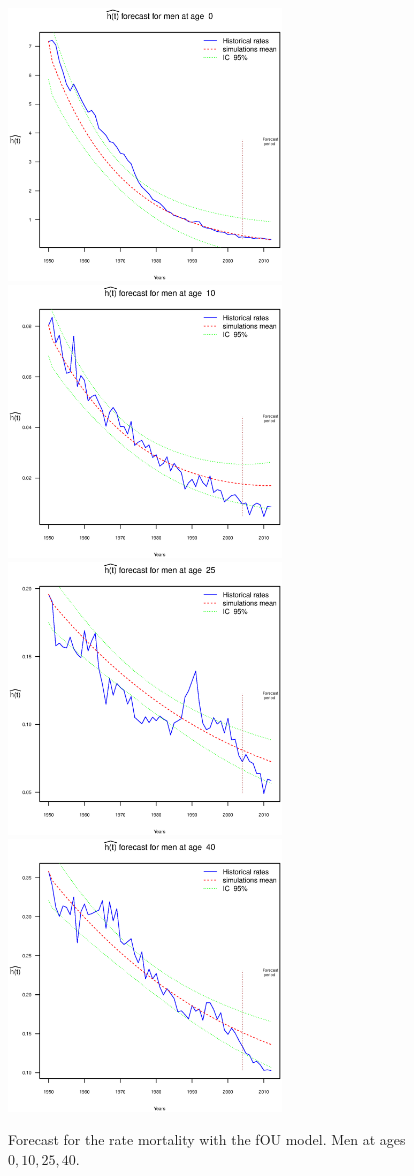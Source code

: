 \documentclass[smallextended]{svjour3}
\begin{document}
\begin{figure}[H]
    \includegraphics[width = 2.85in]{PlotMenForecast0.eps}
    \includegraphics[width = 2.85in]{PlotMenForecast10.eps}
    \includegraphics[width = 2.85in]{PlotMenForecast25.eps}
    \includegraphics[width = 2.85in]{PlotMenForecast40.eps}
    \caption{Forecast for the rate mortality with the fOU model. Men at ages
    $0,10,25,40$.}
    \label{graph-forecast_men_FOU1}
\end{figure}\vspace*{0.1cm}
\end{document}
